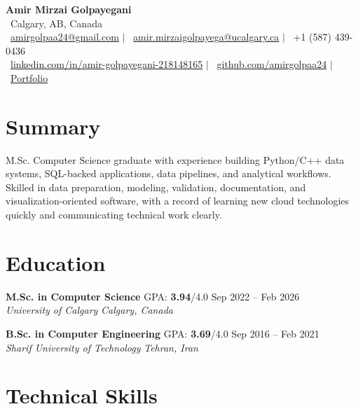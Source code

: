 \documentclass[a4paper,10pt]{article}
\newcommand{\resumeEducationSubheading}[5]{
    \textbf{#1} \hfill #2 \hfill #3 \\
    \textit{#4} \hfill \textit{#5}
}
\begin{document}

\begin{center}
    {\LARGE \textbf{Amir Mirzai Golpayegani}} \\[0.25em]
    \faMapMarker*~Calgary, AB, Canada \\[0.25em]
    \faEnvelope~\href{mailto:amirgolpaa24@gmail.com}{amirgolpaa24@gmail.com}
    $|$
    \faEnvelope~\href{mailto:amir.mirzaigolpayega@ucalgary.ca}{amir.mirzaigolpayega@ucalgary.ca}
    $|$
    \faPhone*~+1 (587) 439-0436 \\[0.25em]
    \faLinkedin~\href{https://linkedin.com/in/amir-golpayegani-218148165}{linkedin.com/in/amir-golpayegani-218148165}
    $|$
    \faGithub~\href{https://github.com/amirgolpaa24}{github.com/amirgolpaa24}
    $|$
    \faGlobe~\href{https://amir-portfolio-navy.vercel.app/}{Portfolio}
\end{center}


\section*{Summary}

M.Sc. Computer Science graduate with experience building Python/C++ data systems, SQL-backed applications, data pipelines, and analytical workflows. Skilled in data preparation, modeling, validation, documentation, and visualization-oriented software, with a record of learning new cloud technologies quickly and communicating technical work clearly.


\section*{Education}

\resumeEducationSubheading
{M.Sc. in Computer Science}
{GPA: \textbf{3.94}/4.0}
{Sep 2022 -- Feb 2026}
{University of Calgary}
{Calgary, Canada}

\vspace{0.35em}

\resumeEducationSubheading
{B.Sc. in Computer Engineering}
{GPA: \textbf{3.69}/4.0}
{Sep 2016 -- Feb 2021}
{Sharif University of Technology}
{Tehran, Iran}


\section*{Technical Skills}
\end{document}

